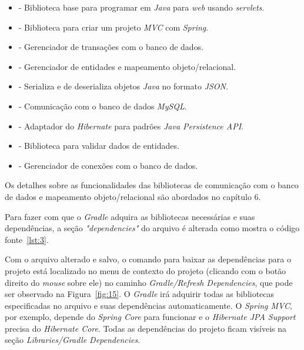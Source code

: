 \begin{itemize}
  \item {} - Biblioteca base para programar em \textit{Java} para \textit{web} usando \textit{servlets}.
  \item {} - Biblioteca para criar um projeto \textit{MVC} com \textit{Spring}.
  \item {} - Gerenciador de transações com o banco de dados.
  \item {} - Gerenciador de entidades e mapeamento objeto/relacional.
  \item {} - Serializa e de deserializa objetos \textit{Java} no formato \textit{JSON}.
  \item {} - Comunicação com o banco de dados \textit{MySQL}.
  \item {} - Adaptador do \textit{Hibernate} para padrões \textit{Java Persistence API}.
  \item {} - Biblioteca para validar dados de entidades.
  \item {} - Gerenciador de conexões com o banco de dados.
\end{itemize}

Os detalhes sobre as funcionalidades das bibliotecas de comunicação com o banco de dados e mapeamento objeto/relacional são abordados no capítulo 6. 

Para fazer com que o \textit{Gradle} adquira as bibliotecas necessárias e suas dependências, a seção \textit{"dependencies"} do arquivo  é alterada como mostra o código fonte~\ref{lst:3}.


Com o arquivo  alterado e salvo, o comando para baixar as dependências para o projeto está localizado no menu de contexto do projeto (clicando com o botão direito do \textit{mouse} sobre ele) no caminho \textit{Gradle/Refresh Dependencies}, que pode ser observado na Figura~\ref{fig:15}. O \textit{Gradle} irá adquirir todas as bibliotecas especificadas no arquivo  e suas dependências automaticamente. O \textit{Spring MVC}, por exemplo, depende do \textit{Spring Core} para funcionar e o \textit{Hibernate JPA Support} precisa do \textit{Hibernate Core}. Todas as dependências do projeto ficam visíveis na seção \textit{Libraries/Gradle Dependencies}.

